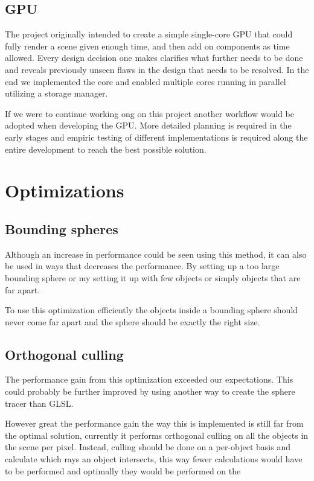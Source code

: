 		
		\subsection{GPU} 
		
			The project originally intended to create a simple single-core GPU
			that could fully render a scene given enough time, and then add on
			components as time allowed. Every design decision one makes clarifies what further needs to be done and reveals previously unseen flaws in the design that needs to be resolved. In the end we implemented the core and enabled multiple cores running in parallel utilizing a storage manager.  
			
            If we were to continue working ong on this project another workflow
            would be adopted when developing the GPU. More detailed planning is 
            required in the early stages and empiric testing of different 
            implementations is required along the entire development to reach
            the best possible solution.

	\section{Optimizations} \label{optimization}

		\subsection{Bounding spheres}
			
			Although an increase in performance could be seen using this
			method, it can also be used in ways that decreases the performance.
			By setting up a too large bounding sphere or my setting it up with
			few objects or simply objects that are far apart.

			To use this optimization efficiently the objects inside a bounding 
			sphere should never come far apart and the sphere should be exactly 
			the right size.

		\subsection{Orthogonal culling}

			The performance gain from this optimization exceeded our 
			expectations. This could probably be further improved by using
			another way to create the sphere tracer than GLSL. 

			However great the performance gain the way this is implemented
			is still far from the optimal solution, currently it performs orthogonal culling on all the objects in the scene per pixel. Instead,
            culling should be done on a per-object basis and calculate
            which rays an object intersects, this way fewer calculations would
            have to be performed and optimally they would be performed on the

